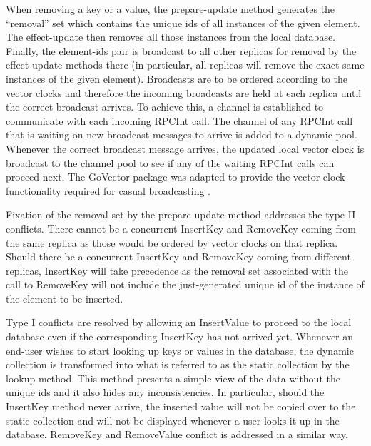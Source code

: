 \documentclass[sigconf,nonacm,11pt]{acmart}
\begin{document}
When removing a key or a value, the prepare-update method generates the ``removal'' set which contains the unique ids of all instances of the given element. The effect-update then removes all those instances from the local database. Finally, the element-ids pair is broadcast to all other replicas for removal by the effect-update methods there (in particular, all replicas will remove the exact same instances of the given element).
Broadcasts are to be ordered according to the vector clocks and therefore the incoming broadcasts are held at each replica until the correct broadcast arrives. To achieve this, a channel is established to communicate with each incoming RPCInt call. The channel of any RPCInt call that is waiting on new broadcast messages to arrive is added to a dynamic pool. Whenever the correct broadcast message arrives, the updated local vector clock is broadcast to the channel pool to see if any of the waiting RPCInt calls can proceed next. The GoVector package was adapted to provide the vector clock functionality required for casual broadcasting \cite{distributedclocks}.

Fixation of the removal set by the prepare-update method addresses the type II conflicts. There cannot be a concurrent InsertKey and RemoveKey coming from the same replica as those would be ordered by vector clocks on that replica. Should there be a concurrent InsertKey and RemoveKey coming from different replicas, InsertKey will take precedence as the removal set associated with the call to RemoveKey will not include the just-generated unique id of the instance of the element to be inserted.

Type I conflicts are resolved by allowing an InsertValue to proceed to the local database even if the corresponding InsertKey has not arrived yet. Whenever an end-user wishes to start looking up keys or values in the database, the dynamic collection is transformed into what is referred to as the static collection by the lookup method. This method presents a simple view of the data without the unique ids and it also hides any inconsistencies. In particular, should the InsertKey method never arrive, the inserted value will not be copied over to the static collection and will not be displayed whenever a user looks it up in the database. RemoveKey and RemoveValue conflict is addressed in a similar way.
\end{document}

